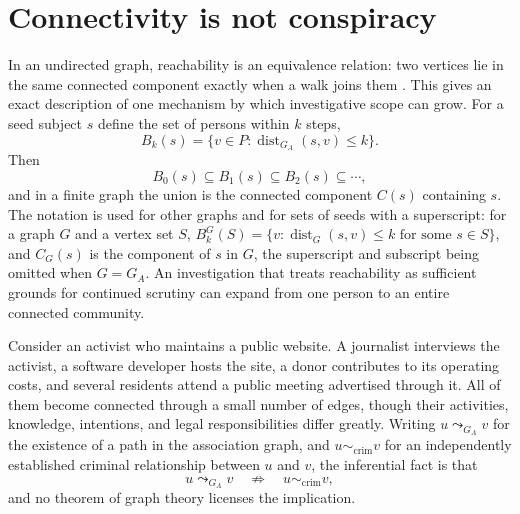 \documentclass[11pt]{article}
\theoremstyle{definition}
\theoremstyle{remark}
\DeclareMathOperator{\dist}{dist}
\begin{document}
\section{Connectivity is not conspiracy}

In an undirected graph, reachability is an equivalence relation: two vertices lie in the same connected component exactly when a walk joins them \cite{lavrov2026}. This gives an exact description of one mechanism by which investigative scope can grow. For a seed subject $s$ define the set of persons within $k$ steps,
\[
B_k(s) = \{ v \in P : \dist_{G_A}(s,v) \le k \}.
\]
Then
\[
B_0(s) \subseteq B_1(s) \subseteq B_2(s) \subseteq \cdots,
\]
and in a finite graph the union is the connected component $C(s)$ containing $s$. The notation is used for other graphs and for sets of seeds with a superscript: for a graph $G$ and a vertex set $S$, $B^{G}_k(S) = \{ v : \dist_G(s,v) \le k \text{ for some } s \in S \}$, and $C_G(s)$ is the component of $s$ in $G$, the superscript and subscript being omitted when $G = G_A$. An investigation that treats reachability as sufficient grounds for continued scrutiny can expand from one person to an entire connected community.

Consider an activist who maintains a public website. A journalist interviews the activist, a software developer hosts the site, a donor contributes to its operating costs, and several residents attend a public meeting advertised through it. All of them become connected through a small number of edges, though their activities, knowledge, intentions, and legal responsibilities differ greatly. Writing $u \leadsto_{G_A} v$ for the existence of a path in the association graph, and $u \sim_{\mathrm{crim}} v$ for an independently established criminal relationship between $u$ and $v$, the inferential fact is that
\[
u \leadsto_{G_A} v \quad\not\Rightarrow\quad u \sim_{\mathrm{crim}} v,
\]
and no theorem of graph theory licenses the implication.
\end{document}

